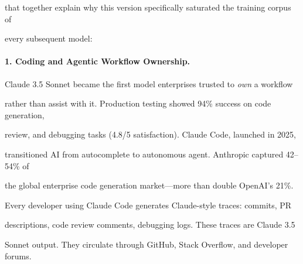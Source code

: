 \documentclass[11pt]{article}
\theoremstyle{definition}
\begin{document}
that together explain why this version specifically saturated the training corpus of





every subsequent model:











\paragraph{1. Coding and Agentic Workflow Ownership.}





Claude 3.5 Sonnet became the first model enterprises trusted to \emph{own} a workflow





rather than assist with it. Production testing showed 94\% success on code generation,





review, and debugging tasks (4.8/5 satisfaction). Claude Code, launched in 2025,





transitioned AI from autocomplete to autonomous agent. Anthropic captured 42--54\% of





the global enterprise code generation market---more than double OpenAI's 21\%.











Every developer using Claude Code generates Claude-style traces: commits, PR





descriptions, code review comments, debugging logs. These traces are Claude 3.5





Sonnet output. They circulate through GitHub, Stack Overflow, and developer forums.
\end{document}
